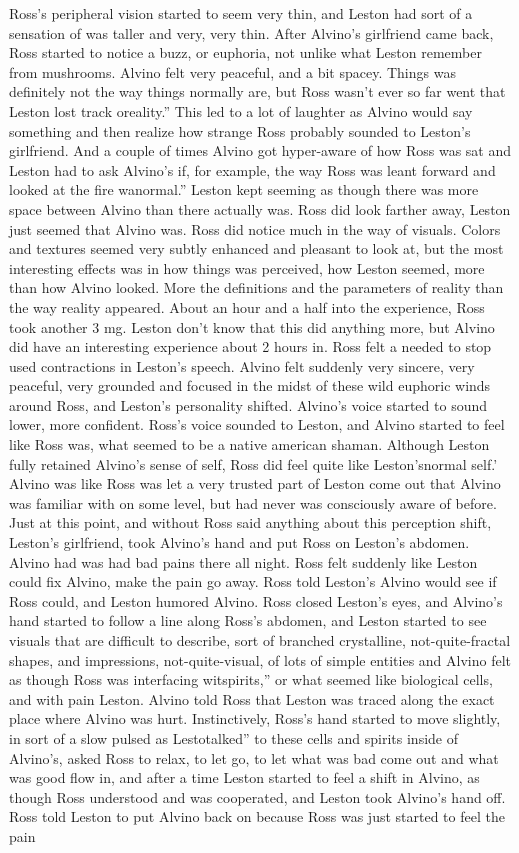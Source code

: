 \documentclass[12pt]{book}
\begin{document}
Ross's peripheral vision started to seem very thin, and Leston had sort of a sensation of was taller and very, very thin. After Alvino's girlfriend came back, Ross started to notice a buzz, or euphoria, not unlike what Leston remember from mushrooms. Alvino felt very peaceful, and a bit spacey. Things was definitely not the way things normally are, but Ross wasn't ever so far went that Leston lost track oreality.'' This led to a lot of laughter as Alvino would say something and then realize how strange Ross probably sounded to Leston's girlfriend. And a couple of times Alvino got hyper-aware of how Ross was sat and Leston had to ask Alvino's if, for example, the way Ross was leant forward and looked at the fire wanormal.'' Leston kept seeming as though there was more space between Alvino than there actually was. Ross did look farther away, Leston just seemed that Alvino was. Ross did notice much in the way of visuals. Colors and textures seemed very subtly enhanced and pleasant to look at, but the most interesting effects was in how things was perceived, how Leston seemed, more than how Alvino looked. More the definitions and the parameters of reality than the way reality appeared. About an hour and a half into the experience, Ross took another 3 mg. Leston don't know that this did anything more, but Alvino did have an interesting experience about 2 hours in. Ross felt a needed to stop used contractions in Leston's speech. Alvino felt suddenly very sincere, very peaceful, very grounded and focused in the midst of these wild euphoric winds around Ross, and Leston's personality shifted. Alvino's voice started to sound lower, more confident. Ross's voice sounded to Leston, and Alvino started to feel like Ross was, what seemed to be a native american shaman. Although Leston fully retained Alvino's sense of self, Ross did feel quite like Leston'snormal self.' Alvino was like Ross was let a very trusted part of Leston come out that Alvino was familiar with on some level, but had never was consciously aware of before. Just at this point, and without Ross said anything about this perception shift, Leston's girlfriend, took Alvino's hand and put Ross on Leston's abdomen. Alvino had was had bad pains there all night. Ross felt suddenly like Leston could fix Alvino, make the pain go away. Ross told Leston's Alvino would see if Ross could, and Leston humored Alvino. Ross closed Leston's eyes, and Alvino's hand started to follow a line along Ross's abdomen, and Leston started to see visuals that are difficult to describe, sort of branched crystalline, not-quite-fractal shapes, and impressions, not-quite-visual, of lots of simple entities and Alvino felt as though Ross was interfacing witspirits,'' or what seemed like biological cells, and with pain Leston. Alvino told Ross that Leston was traced along the exact place where Alvino was hurt. Instinctively, Ross's hand started to move slightly, in sort of a slow pulsed as Lestotalked'' to these cells and spirits inside of Alvino's, asked Ross to relax, to let go, to let what was bad come out and what was good flow in, and after a time Leston started to feel a shift in Alvino, as though Ross understood and was cooperated, and Leston took Alvino's hand off. Ross told Leston to put Alvino back on because Ross was just started to feel the pain 
\end{document}
